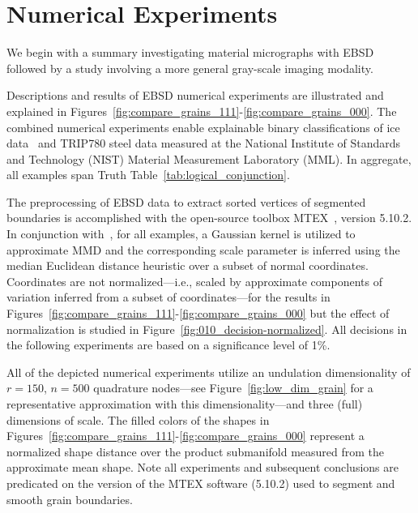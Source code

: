 \documentclass[pdflatex,iicol]{sn-jnl}%
\theoremstyle{thmstyleone}%
\theoremstyle{thmstyletwo}%
\theoremstyle{thmstylethree}%
\begin{document}
\section{Numerical Experiments}\label{sec:experiments}

We begin with a summary investigating material micrographs with EBSD followed by a study involving a more general gray-scale imaging modality.

Descriptions and results of EBSD numerical experiments are illustrated and explained in Figures~\ref{fig:compare_grains_111}-\ref{fig:compare_grains_000}. The combined numerical experiments enable explainable binary classifications of ice data~\cite{Fan2020, FAN2021116810} and TRIP780 steel data measured at the National Institute of Standards and Technology (NIST) Material Measurement Laboratory (MML). In aggregate, all examples span Truth Table~\ref{tab:logical_conjunction}.

The preprocessing of EBSD data to extract sorted vertices of segmented boundaries is accomplished with the open-source toolbox MTEX~\cite{Hielscher:cg5083}, version 5.10.2. In conjunction with~\cite{gretton2012kernel}, for all examples, a Gaussian kernel is utilized to approximate MMD and the corresponding scale parameter is inferred using the median Euclidean distance heuristic over a subset of normal coordinates. Coordinates are not normalized---i.e., scaled by approximate components of variation inferred from a subset of coordinates---for the results in Figures~\ref{fig:compare_grains_111}-\ref{fig:compare_grains_000} but the effect of normalization is studied in Figure~\ref{fig:010_decision-normalized}. All decisions in the following experiments are based on a significance level of 1\%.

All of the depicted numerical experiments utilize an undulation dimensionality of $r=150$, $n=500$ quadrature nodes---see Figure~\ref{fig:low_dim_grain} for a representative approximation with this dimensionality---and three (full) dimensions of scale. The filled colors of the shapes in Figures~\ref{fig:compare_grains_111}-\ref{fig:compare_grains_000} represent a normalized shape distance over the product submanifold measured from the approximate mean shape. Note all experiments and subsequent conclusions are predicated on the version of the MTEX software (5.10.2) used to segment and smooth grain boundaries.
\end{document}
